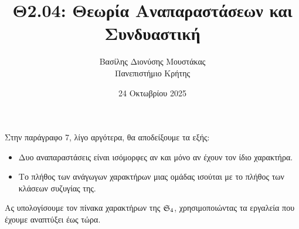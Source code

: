 \documentclass[12pt,a4paper,reqno]{amsart}
\title{Θ2.04: Θεωρία Αναπαραστάσεων και Συνδυαστική}
\author[Β.~Δ. Μουστακας]{Βασίλης Διονύσης Μουστάκας \\ Πανεπιστήμιο Κρήτης}
\date{24 Οκτωβρίου 2025}
\theoremstyle{definition}
\begin{document}
\begingroup
\def\uppercasenonmath#1{} %
\let\MakeUppercase\relax %
\maketitle
\endgroup

\thispagestyle{empty}

Στην παράγραφο 7, λίγο αργότερα, θα αποδείξουμε τα εξής:
\begin{itemize}
    \item Δυο αναπαραστάσεις είναι ισόμορφες αν και μόνο αν έχουν τον ίδιο χαρακτήρα.
    \item Το πλήθος των ανάγωγων χαρακτήρων μιας ομάδας ισούται με το πλήθος των κλάσεων συζυγίας της.
\end{itemize}
Ας υπολογίσουμε τον πίνακα χαρακτήρων της $\mathfrak{S}_4$, χρησιμοποιώντας τα εργαλεία που έχουμε αναπτύξει έως τώρα.
\end{document}
